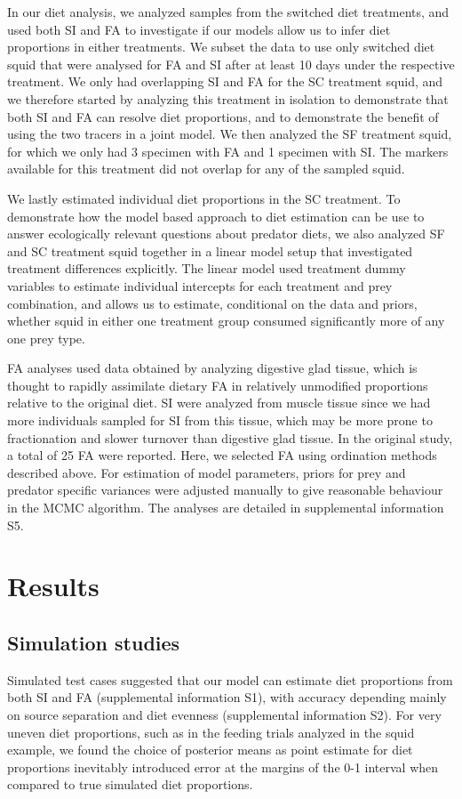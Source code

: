 \documentclass{article}%
\begin{document}
\begin{spacing}{1.9}
\begin{flushleft}
In our diet analysis, we analyzed samples from the switched diet treatments, and
used both SI and FA to investigate if our models allow us to infer diet
proportions in either treatments. We subset the data to use only
switched diet squid that were analysed for FA and SI after at least
10 days under the respective treatment. We only had overlapping
SI and FA for the SC treatment squid, and we therefore started by analyzing this treatment in isolation to
demonstrate that both SI and FA can resolve diet proportions, and to
demonstrate the benefit of using the two tracers in a joint model. We
then analyzed the SF treatment squid, for which we only had 3 specimen with FA
and 1 specimen with SI. The markers available for this treatment did
not overlap for any of the sampled squid. 

We lastly estimated individual diet proportions in the SC
treatment. To demonstrate how the model based approach to diet estimation can be
use to answer ecologically relevant questions about predator
diets, we also analyzed SF and SC treatment squid together in a linear model
setup that investigated treatment differences explicitly. The linear
model used treatment dummy variables to estimate individual intercepts
for each treatment and prey combination, and allows us to estimate,
conditional on the data and priors, whether squid in either one
treatment group consumed significantly more of any one prey type.

FA analyses used data obtained by analyzing digestive glad tissue, which is thought to
rapidly assimilate dietary FA in relatively unmodified
proportions relative to the original diet. SI were analyzed from
muscle tissue since we had more individuals sampled for SI from this tissue, which may be more prone to fractionation and slower
turnover than digestive glad tissue. In the original study, a total of
25 FA were reported. Here, we selected FA using ordination
methods described above. For estimation of model parameters, priors for
prey and predator specific variances were adjusted manually to give
reasonable behaviour in the MCMC algorithm. The analyses are detailed
in supplemental information S5.

\section{Results}

\subsection{Simulation studies}
Simulated test cases suggested that our model can estimate diet
proportions from both SI and FA (supplemental information S1), with
accuracy depending mainly on source separation and diet evenness (supplemental information S2). For very
uneven diet proportions, such as in the feeding trials analyzed in the
squid example, we found the choice of posterior means as point estimate for diet
proportions inevitably introduced error at the margins of
the 0-1 interval when compared to true simulated diet
proportions.


\end{flushleft}
\end{spacing}
\end{document}
